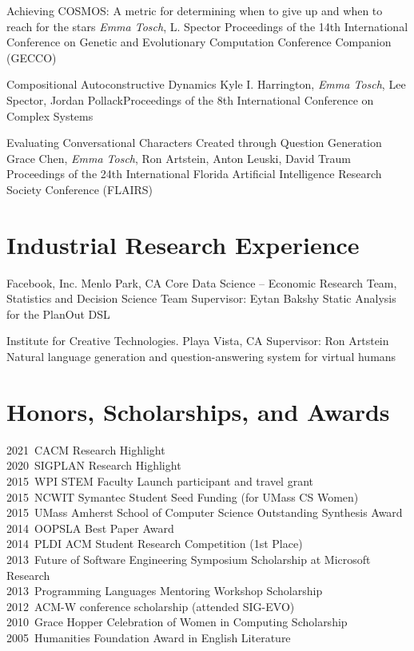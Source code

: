 \documentclass[11pt,a4paper,sans]{moderncv} %
\newcommand{\me}{\emph{Emma Tosch}}
\begin{document}
  {Achieving COSMOS: A metric for determining when to give up and when to reach for the stars}
  {\me{}, L. Spector}
  {Proceedings of the 14th International Conference on Genetic and Evolutionary Computation Conference Companion (GECCO)}
  {}
  {}
  
  {Compositional Autoconstructive Dynamics}
  {Kyle I. Harrington, \me{}, Lee Spector, Jordan Pollack}{Proceedings of the 8th International Conference on Complex Systems}
  {}
  {}
  
  {Evaluating Conversational Characters Created through Question Generation}
  {Grace Chen, \me{}, Ron Artstein, Anton Leuski, David Traum}
  {Proceedings of the 24th International Florida Artificial Intelligence Research Society Conference (FLAIRS)}
  {}
  {}

\section{Industrial Research Experience}

 {Facebook, Inc. Menlo Park, CA}
 {Core Data Science -- Economic Research Team, Statistics and Decision Science Team}
 {Supervisor: Eytan Bakshy}
 {Static Analysis for the PlanOut DSL}
 

  {Institute for Creative Technologies. Playa Vista, CA}
  {}
  {Supervisor: Ron Artstein}
  {Natural language generation and question-answering system for virtual humans}




\section{Honors, Scholarships, and Awards}
  2021~CACM Research Highlight\\
  2020~SIGPLAN Research Highlight\\
  2015~WPI STEM Faculty Launch participant and travel grant\\
  2015~NCWIT Symantec Student Seed Funding (for UMass CS Women)\\
 2015~UMass Amherst School of Computer Science Outstanding Synthesis Award\\
  2014~OOPSLA Best Paper Award\\
  2014~PLDI ACM Student Research Competition (1st Place)\\
  2013~Future of Software Engineering Symposium Scholarship at Microsoft Research\\
  2013~Programming Languages Mentoring Workshop Scholarship\\
  2012~ACM-W conference scholarship (attended SIG-EVO)\\
  2010~Grace Hopper Celebration of Women in Computing Scholarship\\
  2005~Humanities Foundation Award in English Literature\\
\end{document}
